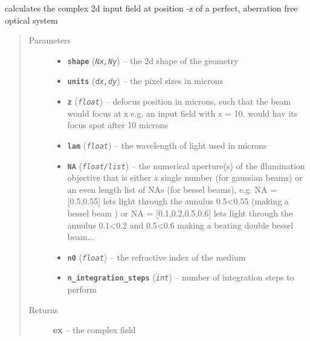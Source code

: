 \documentclass[a4paper,10pt,english]{sphinxmanual}
\begin{document}
\begin{fulllineitems}
\label{beams:biobeam.focus_field_cylindrical_plane}
calculates the complex 2d input field at position -z of a      perfect, aberration free optical system
\begin{quote}\begin{description}
\item[{Parameters}] \leavevmode\begin{itemize}
\item {} 
\textbf{\texttt{shape}} (\emph{\texttt{Nx,Ny}}) -- the 2d shape of the geometry

\item {} 
\textbf{\texttt{units}} (\emph{\texttt{dx,dy}}) -- the pixel sizes in microns

\item {} 
\textbf{\texttt{z}} (\emph{\texttt{float}}) -- defocus position in microns, such that the beam would focus at z
e.g. an input field with z = 10. would hav its focus spot after 10 microns

\item {} 
\textbf{\texttt{lam}} (\emph{\texttt{float}}) -- the wavelength of light used in microns

\item {} 
\textbf{\texttt{NA}} (\emph{\texttt{float/list}}) -- the numerical aperture(s) of the illumination objective
that is either a single number (for gaussian beams) or an
even length list of NAs (for bessel beams), e.g.
NA = {[}0.5,0.55{]} lets light through the annulus 0.5\textless{}0.55 (making a bessel beam ) or
NA = {[}0.1,0.2,0.5,0.6{]} lets light through the annulus 0.1\textless{}0.2 and 0.5\textless{}0.6 making a
beating double bessel beam...

\item {} 
\textbf{\texttt{n0}} (\emph{\texttt{float}}) -- the refractive index of the medium

\item {} 
\textbf{\texttt{n\_integration\_steps}} (\emph{\texttt{int}}) -- number of integration steps to perform

\end{itemize}

\item[{Returns}] \leavevmode
\textbf{ex} --
the complex field


\end{description}
\end{quote}
\end{fulllineitems}
\end{document}
